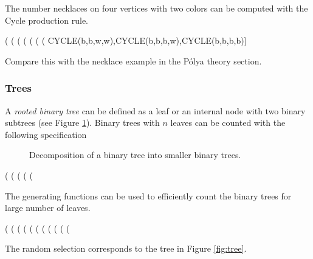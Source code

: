 \documentclass[10pt]{article}
\newcommand{\DEF}[1]{{\em #1}}
\begin{document}
The number necklaces on four vertices with two colors can be computed
with the Cycle production rule.

\begin{example}
(%
(%
(%
(%
(%
(%
(%
       CYCLE(b,b,w,w),CYCLE(b,b,b,w),CYCLE(b,b,b,b)]
\end{example}
%
Compare this with the necklace example in the P\'olya theory section.

\subsubsection{Trees}

A \DEF{rooted binary tree} can be defined as a leaf or an internal
node with two binary subtrees (see Figure \ref{fig:btdef}). Binary
trees with $n$ leaves can be counted with the following specification

\begin{figure}
\begin{center}
\end{center}
\caption{Decomposition of a binary tree into smaller binary trees.}
\label{fig:btdef}
\end{figure}

\begin{example}
(%
(%
(%
(%
(%
\end{example}
%
The generating functions can be used to efficiently count
the binary trees for large number of leaves.

\begin{example}
(%
(%
(%
(%
(%
(%
(%
(%
(%
(%
(%
\end{example}
%
The random selection corresponds to the tree in Figure \ref{fig:tree}.
\end{document}
